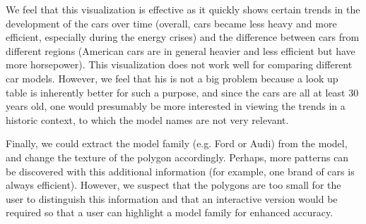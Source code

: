 \documentclass{article}[10pt]
\begin{document}
We feel that this visualization is effective as it quickly shows certain trends
in the development of the cars over time (overall, cars became less heavy and
more efficient, especially during the energy crises) and the difference between
cars from different regions (American cars are in general heavier and less
efficient but have more horsepower). This visualization does not work well for
comparing different car models. However, we feel that his is not a big problem
because a look up table is inherently better for such a purpose, and since the
cars are all at least 30 years old, one would presumably be more interested in
viewing the trends in a historic context, to which the model names are not very
relevant.

Finally, we could extract the model family (e.g. Ford or Audi) from the model,
and change the texture of the polygon accordingly. Perhaps, more patterns can
be discovered with this additional information (for example, one brand of cars is
always efficient). However, we suspect that the polygons are too small for the
user to distinguish this information and that an interactive version would be
required so that a user can highlight a model family for enhanced accuracy.
\end{document}
